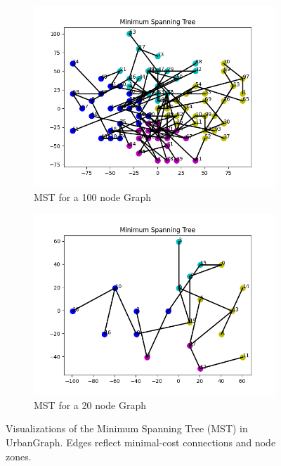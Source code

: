 \documentclass[12pt]{article}
\begin{document}
\begin{figure}[H]
    \centering
    \begin{subfigure}[b]{0.48\textwidth}
        \includegraphics[width=\textwidth]{../Images/sampleMST_1.png}
        \caption{MST for a 100 node Graph}
        \label{fig:mst-1}
    \end{subfigure}
    \hfill
    \begin{subfigure}[b]{0.48\textwidth}
        \includegraphics[width=\textwidth]{../Images/sampleMST_2.png}
        \caption{MST for a 20 node Graph}
        \label{fig:mst-2}
    \end{subfigure}
    \caption{Visualizations of the Minimum Spanning Tree (MST) in UrbanGraph. Edges reflect minimal-cost connections and node zones.}
    \label{fig:mst-both}
\end{figure}
\end{document}

